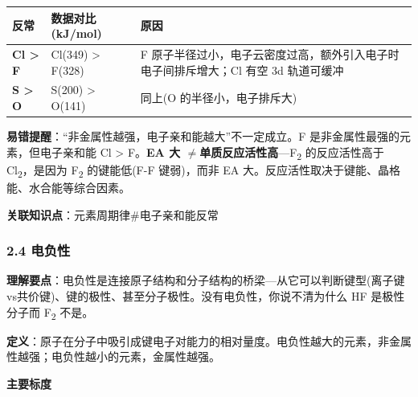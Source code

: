 \documentclass[a4paper,11pt]{ctexart}
\newcounter{none}
\newcommand{\箭}{\ensuremath{\rightarrow}}
\newcommand{\左箭}{\ensuremath{\leftarrow}}
\newcommand{\上箭}{\ensuremath{\uparrow}}
\newcommand{\下箭}{\ensuremath{\downarrow}}
\newcommand{\衡}{\ensuremath{\rightleftharpoons}}
\newcommand{\双箭}{\ensuremath{\leftrightarrow}}
\newcommand{\约等于}{\ensuremath{\approx}}
\newcommand{\小于等于}{\ensuremath{\leq}}
\newcommand{\大于等于}{\ensuremath{\geq}}
\newcommand{\不等于}{\ensuremath{\neq}}
\newcommand{\西格马}{\ensuremath{\sigma}}
\newcommand{\派}{\ensuremath{\pi}}
\begin{document}
{\def\LTcaptype{none} %
\begin{longtable}[]{@{}
  >{\raggedright\arraybackslash}p{}
  >{\raggedright\arraybackslash}p{}
  >{\raggedright\arraybackslash}p{}@{}}
\toprule\noalign{}
\begin{minipage}[b]{\linewidth}\raggedright
反常
\end{minipage} & \begin{minipage}[b]{\linewidth}\raggedright
数据对比 (kJ/mol)
\end{minipage} & \begin{minipage}[b]{\linewidth}\raggedright
原因
\end{minipage} \\
\midrule\noalign{}
\endhead
\bottomrule\noalign{}
\endlastfoot
\textbf{Cl \textgreater{} F} & Cl(349) \textgreater{} F(328) & F 原子半径过小，电子云密度过高，额外引入电子时电子间排斥增大；Cl 有空 3d 轨道可缓冲 \\
\textbf{S \textgreater{} O} & S(200) \textgreater{} O(141) & 同上(O 的半径小，电子排斥大) \\
\end{longtable}
}

\textbf{易错提醒}：``非金属性越强，电子亲和能越大''不一定成立。F 是非金属性最强的元素，但电子亲和能 Cl \textgreater{} F。\textbf{EA 大 \不等于 单质反应活性高}---F\textsubscript{2} 的反应活性高于 Cl\textsubscript{2}，是因为 F\textsubscript{2} 的键能低(F-F 键弱)，而非 EA 大。反应活性取决于键能、晶格能、水合能等综合因素。

\textbf{关联知识点}：元素周期律\#电子亲和能反常

\subsubsection{2.4 电负性}\label{ux7535ux8d1fux6027}

\textbf{理解要点}：电负性是连接原子结构和分子结构的桥梁---从它可以判断键型(离子键vs共价键)、键的极性、甚至分子极性。没有电负性，你说不清为什么 HF 是极性分子而 F\textsubscript{2} 不是。

\textbf{定义}：原子在分子中吸引成键电子对能力的相对量度。电负性越大的元素，非金属性越强；电负性越小的元素，金属性越强。

\textbf{主要标度}
\end{document}

